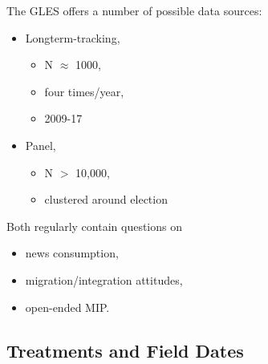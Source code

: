 \documentclass[
  ignorenonframetext,
]{beamer}
\providecommand{\tightlist}{%
  \setlength{\itemsep}{0pt}\setlength{\parskip}{0pt}}
\begin{document}
\begin{frame}{The GLES offers a number of possible data sources:}
\begin{itemize}
\tightlist
\item
  Longterm-tracking,

  \begin{itemize}
  \tightlist
  \item
    N \(\approx\) 1000,
  \item
    four times/year,
  \item
    2009-17
  \end{itemize}
\item
  Panel,

  \begin{itemize}
  \tightlist
  \item
    N \(>\) 10,000,
  \item
    clustered around election
  \end{itemize}
\end{itemize}

Both regularly contain questions on

\begin{itemize}
\tightlist
\item
  news consumption,
\item
  migration/integration attitudes,
\item
  open-ended MIP.
\end{itemize}
\end{frame}

\hypertarget{treatments-and-field-dates}{%
\subsection{Treatments and Field
Dates}\label{treatments-and-field-dates}}
\end{document}
